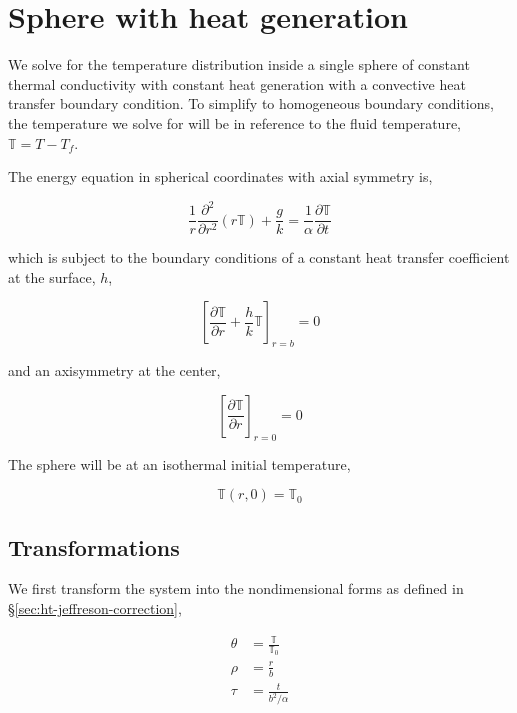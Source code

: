 \section{Sphere with heat generation}\label{sec:analytic-sphere-details}

We solve for the temperature distribution inside a single sphere of constant thermal conductivity with constant heat generation with a convective heat transfer boundary condition. To simplify to homogeneous boundary conditions, the temperature we solve for will be in reference to the fluid temperature, $\mathbb{T} = T-T_f$. 

The energy equation in spherical coordinates with axial symmetry is,

\begin{equation}
    \frac{1}{r}\frac{\partial^2}{\partial r^2}(r\mathbb{T}) + \frac{g}{k} = \frac{1}{\alpha}\frac{\partial \mathbb{T}}{\partial t}
\end{equation}

which is subject to the boundary conditions of a constant heat transfer coefficient at the surface, $h$,

\begin{equation}
    \left[\frac{\partial \mathbb{T}}{\partial r} + \frac{h}{k}\mathbb{T}\right]_{r=b} = 0
\end{equation}

and an axisymmetry at the center,

\begin{equation}
    \left[\frac{\partial \mathbb{T}}{\partial r}\right]_{r=0} = 0
\end{equation}

The sphere will be at an isothermal initial temperature,

\begin{equation}
    \mathbb{T}(r,0) = \mathbb{T}_0
\end{equation}





\subsection{Transformations}

We first transform the system into the nondimensional forms as defined in \S\ref{sec:ht-jeffreson-correction},

\begin{align*}
    \theta &= \frac{\mathbb{T}}{\mathbb{T}_0}\\
    \rho & = \frac{r}{b}\\
    \tau & = \frac{t}{b^2/\alpha}
\end{align*}

